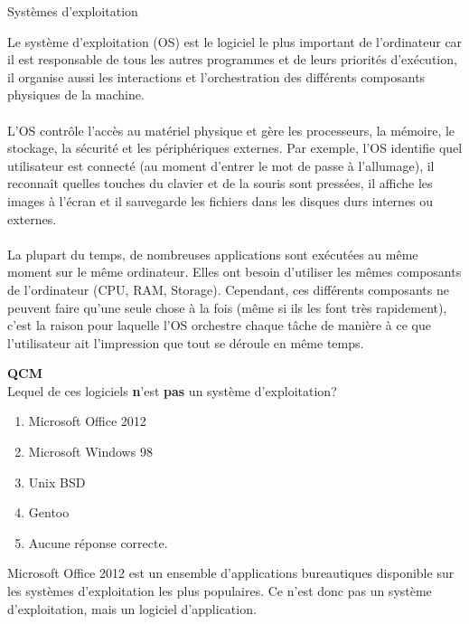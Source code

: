 \begin{section}{Systèmes d'exploitation}
    
Le système d'exploitation (OS) est le logiciel le plus important de l'ordinateur car il est responsable de tous les autres programmes et de leurs priorités d'exécution, il organise aussi les interactions et l'orchestration des différents composants physiques de la machine.
\\\\
L'OS contrôle l'accès au matériel physique et gère les processeurs, la mémoire, le stockage, la sécurité et les périphériques externes. Par exemple, l'OS identifie quel utilisateur est connecté (au moment d'entrer le mot de passe à l'allumage), il reconnaît quelles touches du clavier et de la souris sont pressées, il affiche les images à l'écran et il sauvegarde les fichiers dans les disques durs internes ou externes.
\\\\
La plupart du temps, de nombreuses applications sont exécutées au même moment sur le même ordinateur. Elles ont besoin d'utiliser les mêmes composants de l'ordinateur (CPU, RAM, Storage). Cependant, ces différents composants ne peuvent faire qu'une seule chose à la fois (même si ils les font très rapidement), c'est la raison pour laquelle l'OS orchestre chaque tâche de manière à ce que l'utilisateur ait l'impression que tout se déroule en même temps.
\\

    \begin{Exercice}[3 minutes]  \textbf{QCM}\\
    Lequel de ces logiciels \textbf{n}'est \textbf{pas} un système d'exploitation?
        \begin{enumerate}
            \item Microsoft Office 2012
            \item Microsoft Windows 98
            \item Unix BSD
            \item Gentoo
            \item Aucune réponse correcte.
        \end{enumerate}
    \end{Exercice}
    \begin{solution}
                Microsoft Office 2012 est un ensemble d'applications bureautiques disponible sur les systèmes d'exploitation les plus populaires.
		Ce n'est donc pas un système d'exploitation, mais un logiciel d'application. 
    \end{solution}


\end{section}
